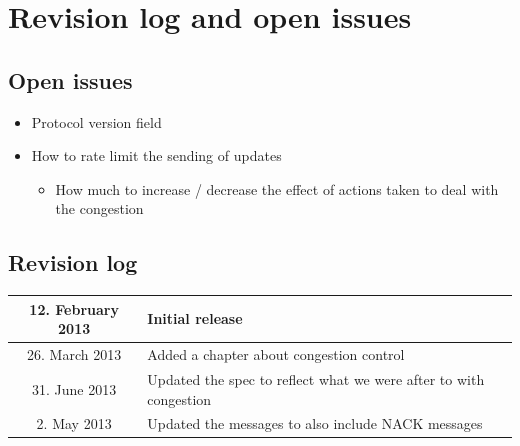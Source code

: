 \chapter{Revision log and open issues}

\section{Open issues}
\begin{itemize}
    \item Protocol version field
    \item How to rate limit the sending of updates
        \begin{itemize}
            \item How much to increase / decrease the effect of actions taken to
            deal with the congestion
        \end{itemize}
\end{itemize}

\section{Revision log}
\begin{tabular}{|c | l |}
\hline
12. February 2013 & Initial release \\
\hline
26. March 2013 & Added a chapter about congestion control\\
\hline
31. June 2013 & Updated the spec to reflect what we were after to with congestion \\
\hline
2. May 2013 & Updated the messages to also include NACK messages \\
\hline
\end{tabular}
